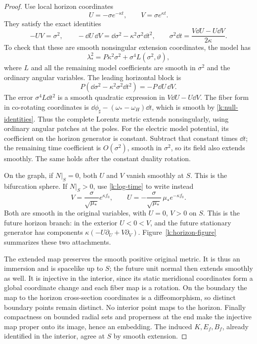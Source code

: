 \begin{proof}
Use local horizon coordinates
\begin{equation}\label{k:null-coordinates}
 U=-\sigma e^{-\kappa t},\qquad
 V=\sigma e^{\kappa t}.
\end{equation}
They satisfy the exact identities
\begin{equation}\label{k:null-identities}
 -UV=\sigma^2,\qquad
 -\dd U\,\dd V=\dd\sigma^2-\kappa^2\sigma^2\dd t^2,\qquad
 \sigma^2\dd t=\frac{V\dd U-U\dd V}{2\kappa}.
\end{equation}
To check that these are smooth nonsingular extension coordinates,
the model has
\[
 \lambda_*^2=P\kappa^2\sigma^2
                       +\sigma^4 L(\sigma^2,\vartheta),
\]
where \(L\) and all the remaining model coefficients are smooth
in \(\sigma^2\) and the ordinary angular variables.
The leading horizontal block is
\[
 P(\dd\sigma^2-\kappa^2\sigma^2\dd t^2)
                  =-P\,\dd U\,\dd V.
\]
The error \(\sigma^4L\dd t^2\) is a smooth quadratic expression
in \(V\dd U-U\dd V\). The fiber form in co-rotating coordinates is
\(\dd\phi_\sharp-(\omega_*-\omega_H)\dd t\), which is smooth by
\eqref{k:null-identities}. Thus the complete Lorentz metric
extends nonsingularly, using ordinary angular patches at the
poles. For the electric model potential, its coefficient on the
horizon generator is constant. Subtract that constant times
\(\dd t\); the remaining time coefficient is \(O(\sigma^2)\),
smooth in \(\sigma^2\), so its field also extends smoothly.
The same holds after the constant duality rotation.

On the graph, if \(N|_S=0\), both \(U\) and \(V\) vanish smoothly
at \(S\). This is the bifurcation sphere. If \(N|_S>0\), use
\eqref{k:log-time} to write instead
\begin{equation}\label{k:future-graph}
 V=\frac{\sigma}{\sqrt{\mu_*}}e^{\kappa f_0},\qquad
 U=-\frac{\sigma}{\sqrt{\mu_*}}\,\mu_*e^{-\kappa f_0}.
\end{equation}
Both are smooth in the original variables, with
\(U=0\), \(V>0\) on \(S\). This is the future horizon branch:
in the exterior \(U<0<V\), and the future stationary generator
has components \(\kappa(-U\partial_U+V\partial_V)\).
Figure~\ref{k:horizon-figure} summarizes these two attachments.

The extended map preserves the smooth positive original metric.
It is thus an immersion and is spacelike up to \(S\);
the future unit normal then extends smoothly as well.
It is injective in the interior, since its static meridional
coordinates form a global coordinate change and each fiber map
is a rotation. On the boundary the map to the horizon
cross-section coordinates is a diffeomorphism, so distinct
boundary points remain distinct. No interior point maps to
the horizon. Finally compactness on bounded radial sets and
properness at the end make the injective map proper onto its
image, hence an embedding. The induced \(K,E_f,B_f\), already
identified in the interior, agree at \(S\) by smooth extension.
\end{proof}

